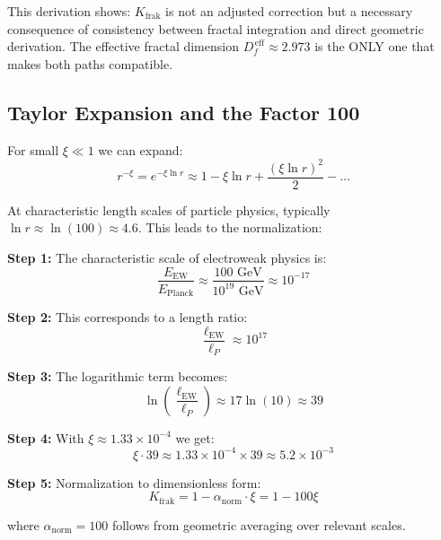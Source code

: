 	This derivation shows: $K_{\text{frak}}$ is not an adjusted correction but a necessary consequence of consistency between fractal integration and direct geometric derivation. The effective fractal dimension $D_f^{\,\text{eff}} \approx 2.973$ is the ONLY one that makes both paths compatible.
	
	\subsection{Taylor Expansion and the Factor 100}
	
	For small $\xi \ll 1$ we can expand:
	\begin{equation}
		r^{-\xi} = e^{-\xi \ln r} \approx 1 - \xi \ln r + \frac{(\xi \ln r)^2}{2} - \ldots
		\label{eq:taylor_expansion}
	\end{equation}
	
	At characteristic length scales of particle physics, typically $\ln r \approx \ln(100) \approx 4.6$. This leads to the normalization:
	
	\begin{tcolorbox}[colback=yellow!5!white,colframe=orange!75!black,title={Derivation of the Factor 100}]
		\textbf{Step 1:} The characteristic scale of electroweak physics is:
		\begin{equation}
			\frac{E_{\text{EW}}}{E_{\text{Planck}}} \approx \frac{100 \text{ GeV}}{10^{19} \text{ GeV}} \approx 10^{-17}
		\end{equation}
		
		\textbf{Step 2:} This corresponds to a length ratio:
		\begin{equation}
			\frac{\ell_{\text{EW}}}{\ell_P} \approx 10^{17}
		\end{equation}
		
		\textbf{Step 3:} The logarithmic term becomes:
		\begin{equation}
			\ln\left(\frac{\ell_{\text{EW}}}{\ell_P}\right) \approx 17 \ln(10) \approx 39
		\end{equation}
		
		\textbf{Step 4:} With $\xi \approx 1.33 \times 10^{-4}$ we get:
		\begin{equation}
			\xi \cdot 39 \approx 1.33 \times 10^{-4} \times 39 \approx 5.2 \times 10^{-3}
		\end{equation}
		
		\textbf{Step 5:} Normalization to dimensionless form:
		\begin{equation}
			K_{\text{frak}} = 1 - \alpha_{\text{norm}} \cdot \xi = 1 - 100\xi
		\end{equation}
		
		where $\alpha_{\text{norm}} = 100$ follows from geometric averaging over relevant scales.
	\end{tcolorbox}
	
